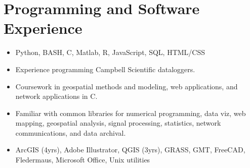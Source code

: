 \section{Programming and Software Experience}
\begin{itemize}
\item Python, BASH, C, Matlab, R, JavaScript, SQL, HTML/CSS
\item Experience programming Campbell Scientific dataloggers. 
\item Coursework in geospatial methods and modeling, web applications, and network applications in C.
\item Familiar with common libraries for numerical programming, data viz,
  web mapping, geospatial analysis, signal processing, statistics, network communications, and data archival. 
\item ArcGIS (4yrs), Adobe Illustrator, QGIS (3yrs), GRASS, GMT, FreeCAD, Fledermaus, Microsoft Office, Unix utilities
\end{itemize}
